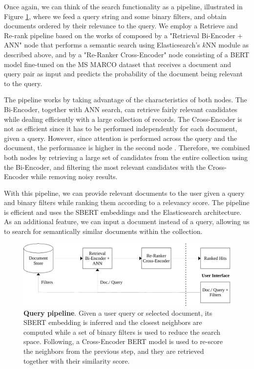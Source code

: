 \documentclass[a4paper]{article}
\begin{document}
Once again, we can think of the search functionality as a pipeline, illustrated in Figure \ref{query_pipeline}, where we feed a query string and some binary filters, and obtain documents ordered by their relevance to the query. We employ a Retrieve and Re-rank pipeline based on the works of \citet{nogueira2020a, kratzwald2019} composed by a "Retrieval Bi-Encoder + ANN" node that performs a semantic search using Elasticsearch’s $k$NN module as described above, and by a "Re-Ranker Cross-Encoder" node consisting of a BERT model fine-tuned on the MS MARCO dataset that receives a document and query pair as input and predicts the probability of the document being relevant to the query.

The pipeline works by taking advantage of the characteristics of both nodes. The Bi-Encoder, together with ANN search, can retrieve fairly relevant candidates while dealing efficiently with a large collection of records. The Cross-Encoder is not as efficient since it has to be performed independently for each document, given a query. However, since attention is performed across the query and the document, the performance is higher in the second node \citep{humeau2019}. Therefore, we combined both nodes by retrieving a large set of candidates from the entire collection using the Bi-Encoder, and filtering the most relevant candidates with the Cross-Encoder while removing noisy results.

With this pipeline, we can provide relevant documents to the user given a query and binary filters while ranking them according to a relevancy score. The pipeline is efficient and uses the SBERT embeddings and the Elasticsearch architecture. As an additional feature, we can input a document instead of a query, allowing us to search for semantically similar documents within the collection.

\begin{figure}[H]
	\centering
	\includegraphics[scale=0.7]{./assets/query_pipeline}
	\caption{\textbf{Query pipeline}. Given a user query or selected document, its SBERT embedding is inferred and the closest neighbors are computed while a set of binary filters is used to reduce the search space. Following, a Cross-Encoder BERT model is used to re-score the neighbors from the previous step, and they are retrieved together with their similarity score.}
	\label{query_pipeline}
\end{figure}
\end{document}
